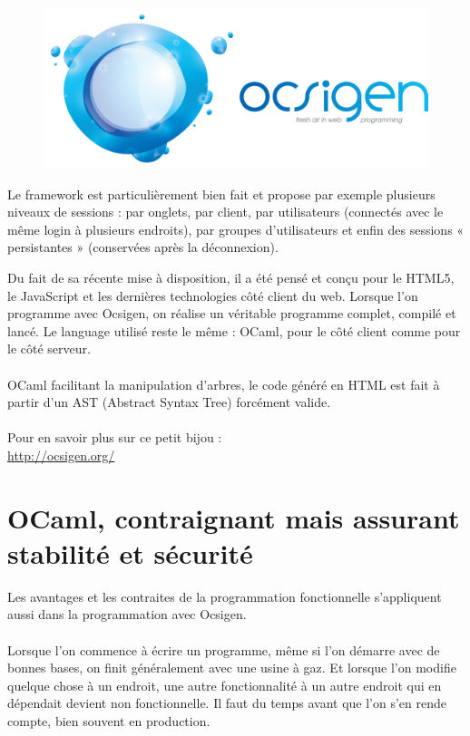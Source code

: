 \documentclass{life-fr}
\begin{document}
\begin{figure}[H]
  \begin{center}
    \includegraphics[width=13cm]{img/ocsigen.png}
  \end{center}
\end{figure}

Le framework est particulièrement bien fait et propose par exemple plusieurs niveaux de sessions : par onglets, par client, par utilisateurs (connectés avec le même login à plusieurs endroits), par groupes d'utilisateurs et enfin des sessions « persistantes » (conservées après la déconnexion).\\

\newpage

Du fait de sa récente mise à disposition, il a été pensé et conçu pour le HTML5, le JavaScript et les dernières technologies côté client du web. Lorsque l'on programme avec Ocsigen, on réalise un véritable programme complet, compilé et lancé. Le language utilisé reste le même : OCaml, pour le côté client comme pour le côté serveur.\\
\\
OCaml facilitant la manipulation d'arbres, le code généré en HTML est fait à partir d'un AST (Abstract Syntax Tree) forcément valide.\\
\\
Pour en savoir plus sur ce petit bijou :\\
\url{http://ocsigen.org/}

\section{OCaml, contraignant mais assurant stabilité et sécurité}

Les avantages et les contraites de la programmation fonctionnelle s'appliquent aussi dans la programmation avec Ocsigen.\\
\\
Lorsque l'on commence à écrire un programme, même si l'on démarre avec de bonnes bases, on finit généralement avec une usine à gaz. Et lorsque l'on modifie quelque chose à un endroit, une autre fonctionnalité à un autre endroit qui en dépendait devient non fonctionnelle. Il faut du temps avant que l'on s'en rende compte, bien souvent en production.\\
\end{document}
